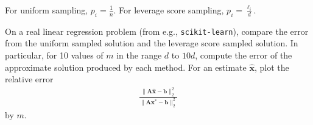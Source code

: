 \documentclass{article}
\begin{document}
For uniform sampling, \(p_i = \frac{1}{n}\). For leverage score sampling, \(p_i = \frac{\ell_i}{d}\).

On a real linear regression problem (from e.g., \texttt{scikit-learn}), compare the error from the uniform sampled solution and the leverage score sampled solution. In particular, for 10 values of \(m\) in the range \(d\) to \(10d\), compute the error of the approximate solution produced by each method. For an estimate \(\widehat{\mathbf{x}}\), plot the relative error \begin{align*}
\frac
{\| \mathbf{A} \widehat{\mathbf{x}} - \mathbf{b} \|_2^2}
{\| \mathbf{A} \mathbf{x}^* - \mathbf{b} \|_2^2}
\end{align*} by \(m\).
\end{document}

